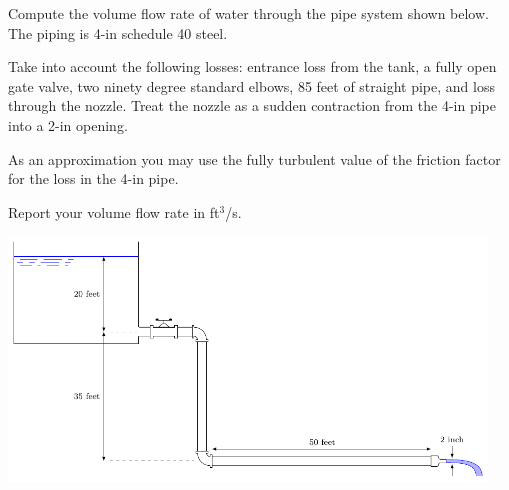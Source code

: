 \documentclass[multi,preview,varwidth=false,border=5,12pt]{standalone}
\begin{document}
\begin{question}

Compute the volume flow rate of water through the pipe system shown below.
The piping is 4-in schedule 40 steel.

Take into account the following losses: entrance loss from the tank, a fully open gate valve, two ninety degree standard elbows, 85 feet of straight pipe, and loss through the nozzle.  Treat the nozzle as a sudden contraction from the 4-in pipe into a 2-in opening.

As an approximation you may use the fully turbulent value of the friction factor for the loss in the 4-in pipe.

Report your volume flow rate in ft$^3$/s.

\includegraphics[width=5in]{imgs/TankGateElbows.pdf}


\begin{solution}

\end{solution}

\end{question}
\end{document}
